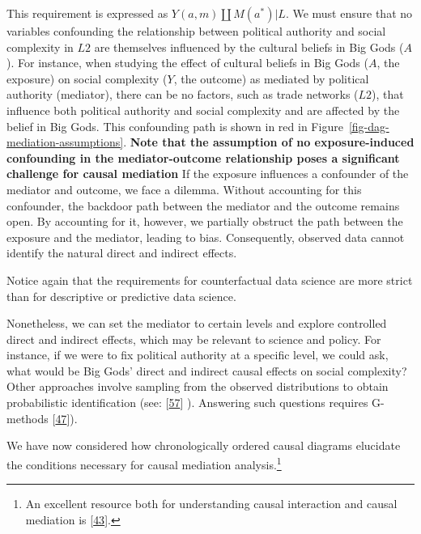 \documentclass[
  singlecolumn]{article}
\begin{document}
This requirement is expressed as \(Y(a,m) \coprod M(a^*) | L\). We must
ensure that no variables confounding the relationship between political
authority and social complexity in \(L2\) are themselves influenced by
the cultural beliefs in Big Gods (\(A\)). For instance, when studying
the effect of cultural beliefs in Big Gods (\(A\), the exposure) on
social complexity (\(Y\), the outcome) as mediated by political
authority (mediator), there can be no factors, such as trade networks
(\(L2\)), that influence both political authority and social complexity
and are affected by the belief in Big Gods. This confounding path is
shown in red in Figure~\ref{fig-dag-mediation-assumptions}. \textbf{Note
that the assumption of no exposure-induced confounding in the
mediator-outcome relationship poses a significant challenge for causal
mediation} If the exposure influences a confounder of the mediator and
outcome, we face a dilemma. Without accounting for this confounder, the
backdoor path between the mediator and the outcome remains open. By
accounting for it, however, we partially obstruct the path between the
exposure and the mediator, leading to bias. Consequently, observed data
cannot identify the natural direct and indirect effects.

Notice again that the requirements for counterfactual data science are
more strict than for descriptive or predictive data science.

Nonetheless, we can set the mediator to certain levels and explore
controlled direct and indirect effects, which may be relevant to science
and policy. For instance, if we were to fix political authority at a
specific level, we could ask, what would be Big Gods' direct and
indirect causal effects on social complexity? Other approaches involve
sampling from the observed distributions to obtain probabilistic
identification (see: {[}\protect\hyperlink{ref-shi2021}{57}{]} ).
Answering such questions requires G-methods
{[}\protect\hyperlink{ref-hernuxe1n2023a}{47}{]}).

We have now considered how chronologically ordered causal diagrams
elucidate the conditions necessary for causal mediation
analysis.\footnote{An excellent resource both for understanding causal
  interaction and causal mediation is
  {[}\protect\hyperlink{ref-vanderweele2015}{43}{]}.}
\end{document}

